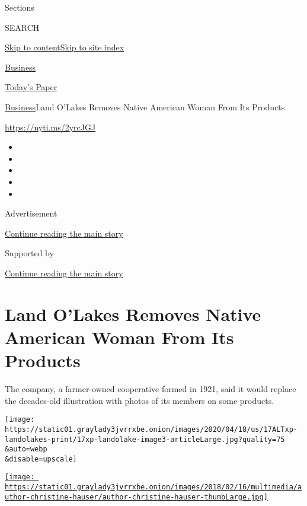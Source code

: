 Sections

SEARCH

\protect\hyperlink{site-content}{Skip to
content}\protect\hyperlink{site-index}{Skip to site index}

\href{https://www.nytimes3xbfgragh.onion/section/business}{Business}

\href{https://myaccount.nytimes3xbfgragh.onion/auth/login?response_type=cookie\&client_id=vi}{}

\href{https://www.nytimes3xbfgragh.onion/section/todayspaper}{Today's
Paper}

\href{/section/business}{Business}\textbar{}Land O'Lakes Removes Native
American Woman From Its Products

\url{https://nyti.ms/2yrcJGJ}

\begin{itemize}
\item
\item
\item
\item
\item
\end{itemize}

Advertisement

\protect\hyperlink{after-top}{Continue reading the main story}

Supported by

\protect\hyperlink{after-sponsor}{Continue reading the main story}

\hypertarget{land-olakes-removes-native-american-woman-from-its-products}{%
\section{Land O'Lakes Removes Native American Woman From Its
Products}\label{land-olakes-removes-native-american-woman-from-its-products}}

The company, a farmer-owned cooperative formed in 1921, said it would
replace the decades-old illustration with photos of its members on some
products.

\texttt{[image: https://static01.graylady3jvrrxbe.onion/images/2020/04/18/us/17ALTxp-landolakes-print/17xp-landolake-image3-articleLarge.jpg?quality=75\\\&auto=webp\\\&disable=upscale]}

\href{https://www.nytimes3xbfgragh.onion/by/christine-hauser}{\texttt{[image: https://static01.graylady3jvrrxbe.onion/images/2018/02/16/multimedia/author-christine-hauser/author-christine-hauser-thumbLarge.jpg]}}

